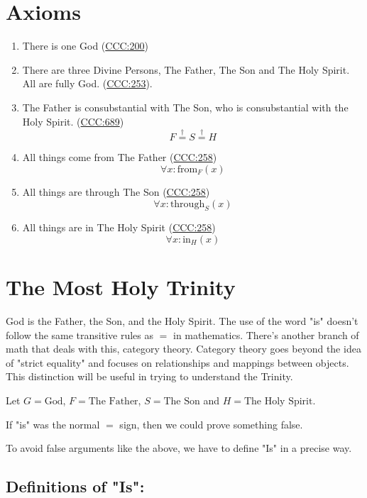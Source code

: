 \documentclass[11pt]{article}
\begin{document}
\section{Axioms}
\label{sec:org3a83f4b}
\begin{enumerate}
\item There is one God (\href{https://www.vatican.va/archive/ENG0015/\_\_P16.HTM}{CCC:200})
\item There are three Divine Persons, The Father, The Son and The Holy Spirit. All are fully God. (\href{https://www.vatican.va/archive/ENG0015/\_\_P17.HTM}{CCC:253}).
\item The Father is consubstantial with The Son, who is consubstantial with the Holy Spirit. (\href{https://www.vatican.va/archive/ENG0015/\_\_P20.HTM}{CCC:689})
$$F \stackrel{\dagger}{=} S \stackrel{\dagger}{=} H$$
\item All things come from The Father (\href{https://www.vatican.va/archive/ENG0015/\_\_P17.HTM}{CCC:258})
$$\forall x : \text{from}_F(x)$$

\item All things are through The Son (\href{https://www.vatican.va/archive/ENG0015/\_\_P17.HTM}{CCC:258})
$$\forall x : \text{through}_S(x)$$

\item All things are in The Holy Spirit (\href{https://www.vatican.va/archive/ENG0015/\_\_P17.HTM}{CCC:258})
$$\forall x : \text{in}_H(x)$$
\end{enumerate}
\section{The Most Holy Trinity}
\label{sec:org0b54c16}
God is the Father, the Son, and the Holy Spirit. The use of the word "is" doesn't follow the same transitive rules as \(=\) in mathematics. There's another branch of math that deals with this, category theory. Category theory goes beyond the idea of "strict equality" and focuses on relationships and mappings between objects. This distinction will be useful in trying to understand the Trinity.

Let \(G = \text{God}\), \(F = \text{The Father}\), \(S = \text{The Son}\) and \(H = \text{The Holy Spirit}\).

If "is" was the normal \(=\) sign, then we could prove something false.

To avoid false arguments like the above, we have to define "Is" in a precise way.
\subsection{Definitions of "Is":}
\label{sec:org109becd}
\end{document}
